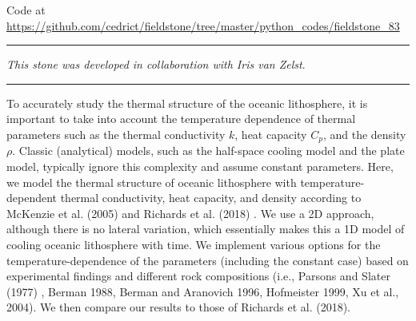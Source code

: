 

\begin{center}
Code at \url{https://github.com/cedrict/fieldstone/tree/master/python_codes/fieldstone_83}
\end{center}

\par\noindent\rule{\textwidth}{0.4pt}

{\sl This stone was developed in collaboration with Iris van Zelst}. 

\par\noindent\rule{\textwidth}{0.4pt}


To accurately study the thermal structure of the oceanic lithosphere, it is important to take 
into account the temperature dependence of thermal parameters such as the thermal conductivity $k$, 
heat capacity $C_p$, and the density $\rho$. Classic (analytical) models, such as the half-space 
cooling model and the plate model, typically ignore this complexity and assume constant parameters. 
Here, we model the thermal structure of oceanic lithosphere with temperature-dependent 
thermal conductivity, heat capacity, and density according to McKenzie et al. (2005) \cite{mcjp05} 
and Richards et al. (2018) \cite{rihc18}. We use a 2D approach, although there is no lateral variation, 
which essentially makes this a 1D model of cooling oceanic lithosphere with time. 
We implement various options for the temperature-dependence of the parameters (including the constant case) 
based on experimental findings and different rock compositions 
(i.e., Parsons and Slater (1977) \cite{pasc77}, 
Berman 1988, Berman and Aranovich 1996, Hofmeister 1999, Xu et al., 2004). 
We then compare our results to those of Richards et al. (2018).

